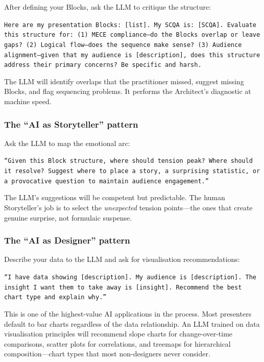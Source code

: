After defining your Blocks, ask the LLM to critique the structure:

\begin{keybox}
\texttt{Here are my presentation Blocks: [list]. My SCQA is: [SCQA]. Evaluate this structure for: (1) MECE compliance---do the Blocks overlap or leave gaps? (2) Logical flow---does the sequence make sense? (3) Audience alignment---given that my audience is [description], does this structure address their primary concerns? Be specific and harsh.}
\end{keybox}

The LLM will identify overlaps that the practitioner missed, suggest missing Blocks, and flag sequencing problems. It performs the Architect's diagnostic at machine speed.

\subsubsection{The ``AI as Storyteller'' pattern}

Ask the LLM to map the emotional arc:

\texttt{``Given this Block structure, where should tension peak? Where should it resolve? Suggest where to place a story, a surprising statistic, or a provocative question to maintain audience engagement.''}

The LLM's suggestions will be competent but predictable. The human Storyteller's job is to select the \emph{unexpected} tension points---the ones that create genuine surprise, not formulaic suspense.

\subsubsection{The ``AI as Designer'' pattern}

Describe your data to the LLM and ask for visualisation recommendations:

\texttt{``I have data showing [description]. My audience is [description]. The insight I want them to take away is [insight]. Recommend the best chart type and explain why.''}

This is one of the highest-value AI applications in the process. Most presenters default to bar charts regardless of the data relationship. An LLM trained on data visualisation principles will recommend slope charts for change-over-time comparisons, scatter plots for correlations, and treemaps for hierarchical composition---chart types that most non-designers never consider.

